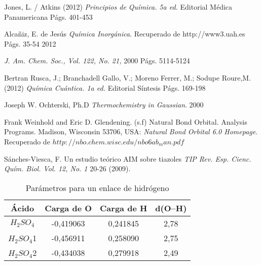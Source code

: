 \begin{thebibliography}{9}

Jones, L. / Atkins (2012)
\textit{Principios de Química. 5a ed.} Editorial Médica Panamericana
Págs. 401-453

Alcañiz, E. de Jesús
\textit{Química Inorgánica}. 
Recuperado de http://www3.uah.es Págs. 35-54
2012

\textit{J. Am. Chem. Soc., Vol. 122, No. 21, }
2000 Págs. 5114-5124

Bertran Rusca, J.; Branchadell Gallo, V.; Moreno Ferrer, M.; Sodupe Roure,M. (2012)
\textit{Química Cuántica. 1a ed.} Editorial Síntesis
Págs. 169-198

Joseph W. Ochterski, Ph.D
\textit{Thermochemistry in Gaussian}.
2000

Frank Weinhold and Eric D. Glendening. (s.f) Natural Bond Orbital. Analysis Programs. Madison, Wisconsin 53706, USA: 
\textit {Natural Bond Orbital 6.0 Homepage}. Recuperado de $http://nbo.chem.wisc.edu/nbo6ab_man.pdf$

Sánches-Viesca, F. Un estudio teórico AIM sobre tiazoles \textit{TIP Rev. Esp. Cienc. Quím. Biol. Vol. 12, No. 1} 20-26 (2009).
\end{thebibliography}

\begin{table}[H]
	\centering
	\begin{tabular}{|c|c|c|c|}
		\hline
		Ácido & Carga de O & Carga de H & d(O--H) \\ \hline
		$H_2SO_4$ & -0,419063 & 0,241845 & 2,78 \\ \hline
		$H_2SO_4$1 & -0,456911 & 0,258090 & 2,75 \\ \hline
		$H_2SO_4$2 & -0,434038 & 0,279918 & 2,49 \\ \hline
	\end{tabular}
	\caption{Parámetros para un enlace de hidrógeno}
\end{table}